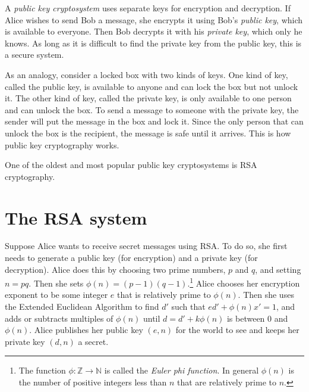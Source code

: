 \label{lab:RSA}


A \emph{public key cryptosystem} uses separate keys for encryption and decryption.
If Alice wishes to send Bob a message, she encrypts it using Bob's \emph{public key}, which is available to everyone.
Then Bob decrypts it with his \emph{private key}, which only he knows.
As long as it is difficult to find the private key from the public key, this is a secure system.


As an analogy, consider a locked box with two kinds of keys.
One kind of key, called the public key, is available to anyone and can lock the box but not unlock it.
The other kind of key, called the private key, is only available to one person and can unlock the box.
To send a message to someone with the private key, the sender will put the message in the box and lock it.
Since the only person that can unlock the box is the recipient, the message is safe until it arrives. This is how public key cryptography works.

One of the oldest and most popular public key cryptosystems is RSA cryptography.


\section*{The RSA system}
Suppose Alice wants to receive secret messages using RSA.
To do so, she first needs to generate a public key (for encryption) and a private key (for decryption).
Alice does this by choosing two prime numbers, $p$ and $q$, and setting $n=pq$.
Then she sets $\phi(n) = (p-1)(q-1)$.\footnote{
The function $\phi: \mathbb{Z} \rightarrow \mathbb{N}$ is called the \emph{Euler phi function}. In general $\phi(n)$ is the number of positive integers less than $n$ that are relatively prime to $n$.}
Alice chooses her encryption exponent to be some integer $e$ that is relatively prime to $\phi(n)$.
Then she uses the Extended Euclidean Algorithm to find $d'$ such that $ed' + \phi(n)x' = 1$, and adds or subtracts multiples of $\phi(n)$ until $d = d'+k\phi(n)$ is between 0 and $\phi(n)$.
Alice publishes her public key $(e, n)$ for the world to see and keeps her private key $(d,n)$ a secret.

